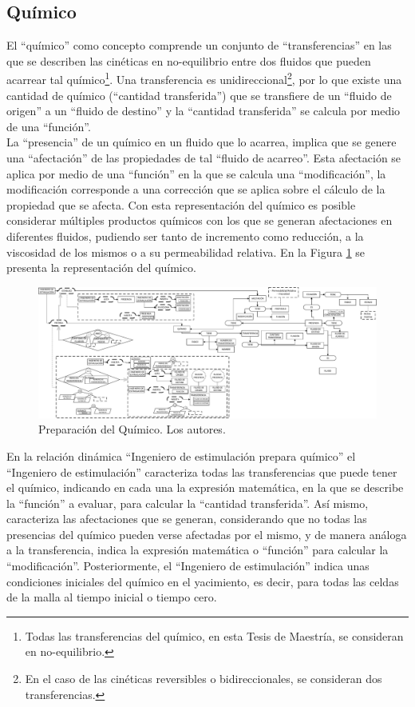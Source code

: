 \subsection{Químico}\label{subsec:PS_Chemical}
El ``químico'' como concepto comprende un conjunto de ``transferencias'' en las que se describen las cinéticas en no-equilibrio entre dos fluidos que pueden acarrear tal químico\footnote{Todas las transferencias del químico, en esta Tesis de Maestría, se consideran en no-equilibrio.}. Una transferencia es unidireccional\footnote{En el caso de las cinéticas reversibles o bidireccionales, se consideran dos transferencias.}, por lo que existe una cantidad de químico (``cantidad transferida'') que se transfiere de un ``fluido de origen'' a un ``fluido de destino'' y la ``cantidad transferida'' se calcula por medio de una ``función''.\\

La ``presencia'' de un químico en un fluido que lo acarrea, implica que se genere una ``afectación'' de las propiedades de tal ``fluido de acarreo''. Esta afectación se aplica por medio de una ``función'' en la que se calcula una ``modificación'', la modificación corresponde a una corrección que se aplica sobre el cálculo de la propiedad que se afecta. Con esta representación del químico es posible considerar múltiples productos químicos con los que se generan afectaciones en diferentes fluidos, pudiendo ser tanto de incremento como reducción, a la viscosidad de los mismos o a su permeabilidad relativa. En la Figura \ref{fig:Chemical} se presenta la representación del químico.\\

\begin{figure}[h]
	\centering%
	\includegraphics[width=0.9\linewidth]{Fig/QuimicoStruct.pdf}%
	\caption[Preparación del Químico.]{Preparación del Químico. Los autores.} \label{fig:Chemical}
\end{figure}

En la relación dinámica ``Ingeniero de estimulación prepara químico'' el ``Ingeniero de estimulación'' caracteriza todas las transferencias que puede tener el químico, indicando en cada una la expresión matemática, en la que se describe la ``función'' a evaluar, para calcular la ``cantidad transferida''. Así mismo, caracteriza las afectaciones que se generan, considerando que no todas las presencias del químico pueden verse afectadas por el mismo, y de manera análoga a la transferencia, indica la expresión matemática o ``función'' para calcular la ``modificación''. Posteriormente, el ``Ingeniero de estimulación'' indica unas condiciones iniciales del químico en el yacimiento, es decir, para todas las celdas de la malla al tiempo inicial o tiempo cero. 

